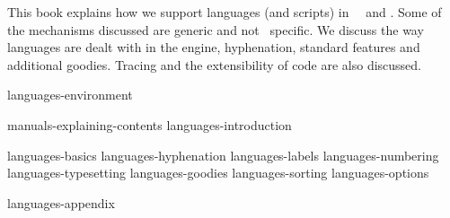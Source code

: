 
%
%

\enablemode[simple] %

\startbuffer[abstract]

    This book explains how we support languages (and scripts) in \CONTEXT\ \MKIV\
    and \LUATEX. Some of the mechanisms discussed are generic and not \CONTEXT\
    specific. We discuss the way languages are dealt with in the engine,
    hyphenation, standard features and additional goodies. Tracing and the
    extensibility of code are also discussed.

\stopbuffer

\environment languages-environment

\startdocument
  [author=Hans Hagen,
   title=Languages in \ConTeXt,
   subtitle=explaining luatex and mkiv,
   affiliation=PRAGMA ADE,
   comment=work in progress,
   cover:color:1=darkmagenta,
   cover:color:2=darkorange,
   cover:color:3=darkyellow,
   cover:color:4=darkcyan,
   cover:color:5=darkgray]

    \startfrontmatter
        \component manuals-explaining-contents
        \component languages-introduction
    \stopfrontmatter

    \startbodymatter
        \component languages-basics
        \component languages-hyphenation
        \component languages-labels
        \component languages-numbering
        \component languages-typesetting
        \component languages-goodies
        \component languages-sorting
        \component languages-options
    \stopbodymatter

    \startappendices
        \component languages-appendix
    \stopappendices

\stopdocument
